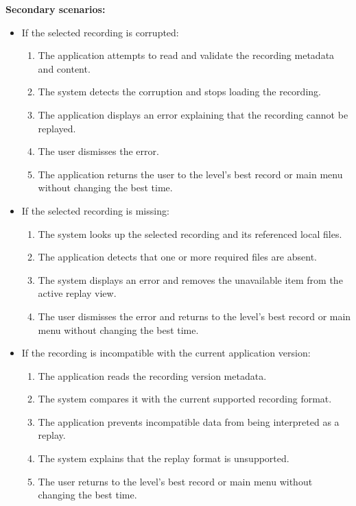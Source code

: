 \documentclass[12pt]{article}
\begin{document}
\begin{description}
\textbf{Secondary scenarios:}
\begin{itemize}
\item If the selected recording is corrupted:
\begin{enumerate}
\item The application attempts to read and validate the recording metadata and content.
\item The system detects the corruption and stops loading the recording.
\item The application displays an error explaining that the recording cannot be replayed.
\item The user dismisses the error.
\item The application returns the user to the level's best record or main menu
without changing the best time.
\end{enumerate}
\item If the selected recording is missing:
\begin{enumerate}
\item The system looks up the selected recording and its referenced local files.
\item The application detects that one or more required files are absent.
\item The system displays an error and removes the unavailable item from the active
replay view.
\item The user dismisses the error and returns to the level's best record or main
menu without changing the best time.
\end{enumerate}
\item If the recording is incompatible with the current application version:
\begin{enumerate}
\item The application reads the recording version metadata.
\item The system compares it with the current supported recording format.
\item The application prevents incompatible data from being interpreted as a replay.
\item The system explains that the replay format is unsupported.
\item The user returns to the level's best record or main menu without changing
the best time.
\end{enumerate}
\end{itemize}

\item[U-05: Connecting to Multiplayer Training Session (optional)]\mbox{}


\end{description}
\end{document}
